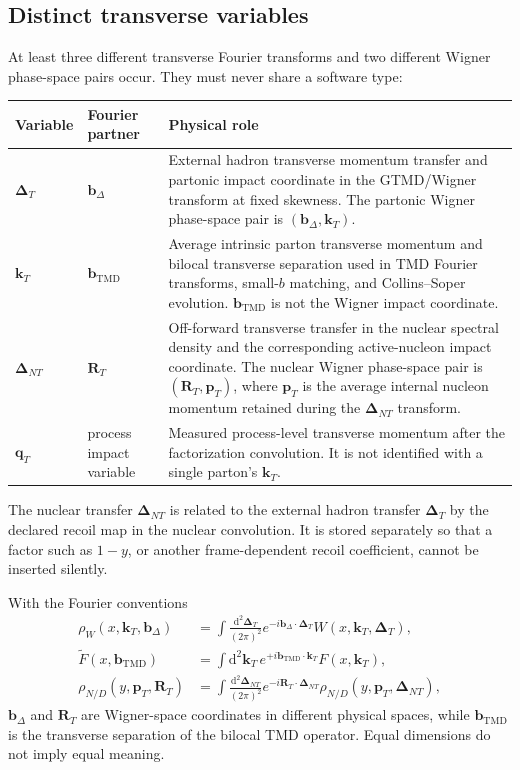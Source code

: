 \documentclass[11pt]{article}
\newcommand{\kT}{\bm{k}_{T}}
\newcommand{\pT}{\bm{p}_{T}}
\newcommand{\qT}{\bm{q}_{T}}
\newcommand{\DT}{\bm{\Delta}_{T}}
\newcommand{\DNT}{\bm{\Delta}_{N T}}
\newcommand{\bD}{\bm{b}_{\Delta}}
\newcommand{\bM}{\bm{b}_{\mathrm{TMD}}}
\newcommand{\RT}{\bm{R}_{T}}
\newcommand{\dd}{\mathrm{d}}
\begin{document}
\subsection{Distinct transverse variables}

At least three different transverse Fourier transforms and two different
Wigner phase-space pairs occur.  They must never share a software type:
\begin{longtable}{L{0.17\textwidth}L{0.18\textwidth}L{0.56\textwidth}}
\toprule
Variable & Fourier partner & Physical role\\
\midrule
\endhead
\(\DT\) & \(\bD\) & External hadron transverse momentum transfer and
partonic impact coordinate in the GTMD/Wigner transform at fixed skewness.
The partonic Wigner phase-space pair is \((\bD,\kT)\).\\
\(\kT\) & \(\bM\) & Average intrinsic parton transverse momentum and
bilocal transverse separation used in TMD Fourier transforms, small-\(b\)
matching, and Collins--Soper evolution.  \(\bM\) is not the Wigner impact
coordinate.\\
\(\DNT\) & \(\RT\) & Off-forward transverse transfer in the nuclear
spectral density and the corresponding active-nucleon impact coordinate.  The
nuclear Wigner phase-space pair is \((\RT,\pT)\), where \(\pT\) is the
average internal nucleon momentum retained during the \(\DNT\) transform.\\
\(\qT\) & process impact variable & Measured process-level transverse
momentum after the factorization convolution.  It is not identified with a
single parton's \(\kT\).\\
\bottomrule
\end{longtable}
The nuclear transfer \(\DNT\) is related to the external hadron transfer
\(\DT\) by the declared recoil map in the nuclear convolution.  It is stored
separately so that a factor such as \(1-y\), or another frame-dependent recoil
coefficient, cannot be inserted silently.

With the Fourier conventions
\begin{align}
 \rho_W(x,\kT,\bD)
 &=\int\frac{\dd^2\DT}{(2\pi)^2}
 e^{-i\bD\cdot\DT}
 W(x,\kT,\DT),
\label{eq:wigner-transform-convention}\\
 \widetilde F(x,\bM)
 &=\int\dd^2\kT\,e^{+i\bM\cdot\kT}F(x,\kT),
\label{eq:tmd-transform-convention}\\
 \rho_{N/D}(y,\pT,\RT)
 &=\int\frac{\dd^2\DNT}{(2\pi)^2}
 e^{-i\RT\cdot\DNT}
 \rho_{N/D}(y,\pT,\DNT),
\label{eq:nuclear-wigner-transform-convention}
\end{align}
\(\bD\) and \(\RT\) are Wigner-space coordinates in different physical
spaces, while \(\bM\) is the transverse separation of the bilocal TMD
operator.  Equal dimensions do not imply equal meaning.
\end{document}
